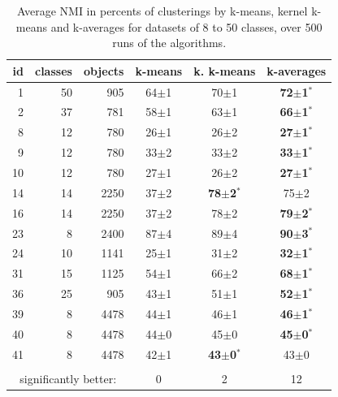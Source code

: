 \documentclass[10pt,journal,compsoc]{IEEEtran}
\begin{document}
 
 
   
\begin{table} 
\begin{center} 
\caption{Average NMI in percents of clusterings by k-means, kernel k-means and k-averages for datasets of 8 to 50 classes, over 500 runs of the algorithms.}
\label{tab:results-8}
\begin{tabular}{rrrccc} 
id & classes & objects & k-means & k. k-means & k-averages \\ 
\hline 
 1 & 50 &  905 & 64$\pm$1 & 70$\pm$1 & \textbf{72$\pm$1$^*$} \\ 
 2 & 37 &  781 & 58$\pm$1 & 63$\pm$1 & \textbf{66$\pm$1$^*$} \\ 
 8 & 12 &  780 & 26$\pm$1 & 26$\pm$2 & \textbf{27$\pm$1$^*$} \\ 
 9 & 12 &  780 & 33$\pm$2 & 33$\pm$2 & \textbf{33$\pm$1$^*$} \\ 
10 & 12 &  780 & 27$\pm$1 & 26$\pm$2 & \textbf{27$\pm$1$^*$} \\ 
14 & 14 & 2250 & 37$\pm$2 & \textbf{78$\pm$2$^*$} & 75$\pm$2 \\ 
16 & 14 & 2250 & 37$\pm$2 & 78$\pm$2 & \textbf{79$\pm$2$^*$} \\ 
23 &  8 & 2400 & 87$\pm$4 & 89$\pm$4 & \textbf{90$\pm$3$^*$} \\ 
24 & 10 & 1141 & 25$\pm$1 & 31$\pm$2 & \textbf{32$\pm$1$^*$} \\ 
31 & 15 & 1125 & 54$\pm$1 & 66$\pm$2 & \textbf{68$\pm$1$^*$} \\ 
36 & 25 &  905 & 43$\pm$1 & 51$\pm$1 & \textbf{52$\pm$1$^*$} \\ 
39 &  8 & 4478 & 44$\pm$1 & 46$\pm$1 & \textbf{46$\pm$1$^*$} \\ 
40 &  8 & 4478 & 44$\pm$0 & 45$\pm$0 & \textbf{45$\pm$0$^*$} \\ 
41 &  8 & 4478 & 42$\pm$1 & \textbf{43$\pm$0$^*$} & 43$\pm$0 \\ 
\hline 
\vspace{-.2cm} \\
\multicolumn{3}{c}{significantly better:}  & 0 & 2 & 12 \\ 
\end{tabular} 
\end{center} 
\end{table} 
 
\end{document}
